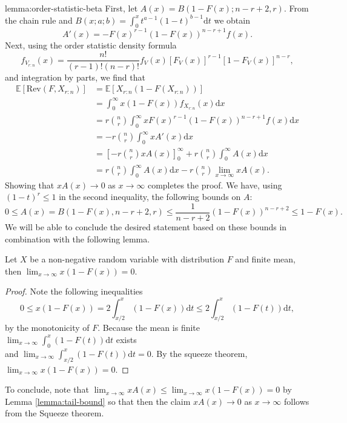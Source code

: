 \documentclass[11pt]{article}
\newcommand{\E}{\mathbb{E}}
\newcommand{\dd}{\mathrm{d}}
\newcommand{\Rev}{\mathrm{Rev}}
\begin{document}
\begin{cleverproof}{lemma:order-statistic-beta}
    First, let $A(x)=B(1-F(x); n-r+2,r)$. From the chain rule and $B(x;a;b)=\int_0^xt^{a-1}(1-t)^{b-1}\dd t$ we obtain
    $$
    A'(x)=-F(x)^{r-1}(1-F(x))^{n-r+1}f(x).
    $$
    Next, using the order statistic density formula 
    $$
    f_{V_{r:n}}(x) = \frac{n!}{(r-1)!(n-r)!} f_{V}(x) \left[ F_{V}(x) \right]^{r-1} \left[ 1 - F_{V}(x) \right]^{n-r},
    $$ 
    and integration by parts, we find that 
    \begin{align*}
        \E[\Rev(F,X_{r:n})]&=\E[X_{r:n}(1-F(X_{r:n}))]\\&=\int_0^\infty x(1-F(x))f_{X_{r:n}}(x)\dd x\\
        &=r\binom{n}{r}\int_0^\infty xF(x)^{r-1}(1-F(x))^{n-r+1}f(x)\dd x\\
        &=-r\binom{n}{r}\int_0^\infty xA'(x)\dd x\\
        &=\left[-r\binom{n}{r}xA(x)\right]_0^\infty+r\binom{n}{r}\int_0^\infty A(x)\dd x\\
        &=r\binom{n}{r}\int_0^\infty A(x)\dd x-r\binom{n}{r}\lim_{x\to\infty}xA(x).
    \end{align*}
    Showing that $xA(x)\to 0$ as $x\to\infty$ completes the proof. We have, using $(1-t)^{r} \leq 1$ in the second inequality, the following bounds on $A$:
    $$
    0\le A(x)=B(1-F(x),n-r+2,r)\le \frac{1}{n-r+2}(1-F(x))^{n-r+2}\le 1-F(x).
    $$
    We will be able to conclude the desired statement based on these bounds in combination with the following lemma.

    \begin{lemma}
    \label{lemma:tail-bound}
    Let $X$ be a non-negative random variable with distribution $F$ and finite mean, then $\lim_{x\to\infty}x(1-F(x))=0$.
\end{lemma}
\begin{proof}
    Note the following inequalities
    $$
    0\le x(1-F(x))=2\int_{x/2}^x(1-F(x))\dd t\le 2\int_{x/2}^x(1-F(t))\dd t,
    $$
    by the monotonicity of $F$.
    Because the mean is finite $\lim_{x\to\infty} \int_0^x(1-F(t))\dd t$ exists\\ and $\lim_{x\to \infty}\int_{x/2}^x(1-F(t))\dd t=0$. By the squeeze theorem, $\lim_{x\to\infty}x(1-F(x))=0$.
\end{proof}
    To  conclude, note that $\lim_{x\to\infty}xA(x)\le \lim_{x\to\infty}x(1-F(x))=0$ by Lemma \ref{lemma:tail-bound} so that then the claim  $xA(x)\to 0$ as $x\to\infty$ follows from the Squeeze theorem.
\end{cleverproof}
\bigskip
\end{document}
